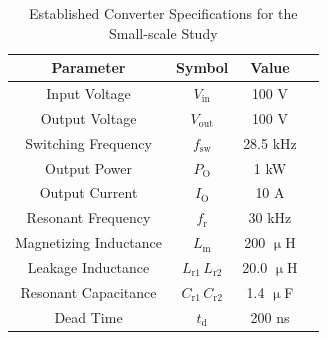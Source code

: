 \begin{table}[h!]
\centering
\caption{Established Converter Specifications for the Small-scale Study}
\label{tab:1kW}
\begin{tabular}{cccc}
\hline
\textbf{Parameter} & \textbf{Symbol} & \textbf{Value} \\
\hline \hline
Input Voltage & $V_{\mathrm{in}}$ & 100 V \\ 
Output Voltage & $V_{\mathrm{out}}$ & 100 V   \\
Switching Frequency & $f_{\mathrm{sw}}$ & 28.5 kHz \\ 
Output Power & $P_\mathrm{O}$ & 1 kW \\
Output Current & $I_\mathrm{O}$ & 10 A \\
\hline
Resonant Frequency & $f_{\mathrm{r}}$ & 30 kHz \\ 
Magnetizing Inductance & $L_\mathrm{m}$ & 200 $\upmu$H   \\
Leakage Inductance & $L_\mathrm{r1}\, L_\mathrm{r2}$ & 20.0 $\upmu$H \\ 
Resonant Capacitance & $C_\mathrm{r1}\, C_\mathrm{r2}$ & 1.4 $\upmu$F \\
Dead Time & $t_\mathrm{d}$ & 200 ns \\
\hline
\end{tabular}
\end{table}





